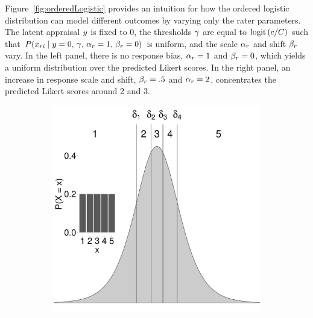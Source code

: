 \documentclass[a4paper]{article}
\begin{document}
Figure~\ref{fig:orderedLogistic} provides an intuition for how the ordered logistic distribution can model different outcomes by varying only the rater parameters. The latent appraisal $y$ is fixed to 0, the thresholds $\gamma$ are equal to $\text{logit}\left(c/C\right)$ such that $P(x_{ri}\mid y=0,\,\gamma,\,\alpha_r=1,\,\beta_r=0)$ is uniform, and the scale $\alpha_r$ and shift $\beta_r$ vary. In the left panel, there is no response bias, $\alpha_r = 1$ and $\beta_r = 0$, which yields a uniform distribution over the predicted Likert scores. In the right panel, an increase in response scale and shift, $\beta_r = .5$ and $\alpha_r = 2$, concentrates the predicted Likert scores around 2 and 3.
\begin{figure}[!ht]
	\centering
	\begin{subfigure}{.5\textwidth}
		\centering
		\includegraphics[width=.97\textwidth]{figures/orderedLogisticUnbiased.pdf}
	\end{subfigure}%
	\begin{subfigure}{.5\textwidth}
		\centering

\end{subfigure}
\end{figure}
\end{document}
